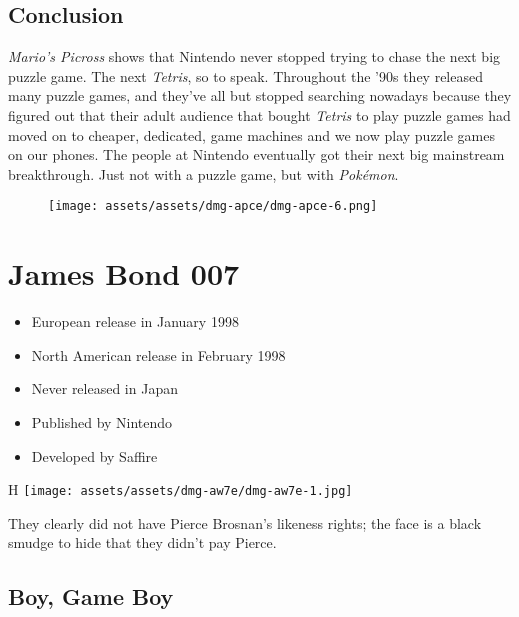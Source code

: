 \documentclass{book}
\begin{document}
\FloatBarrier\needspace{5pt}\section*{Conclusion}\nopagebreak[4]

\emph{Mario’s Picross} shows that Nintendo never stopped trying to chase the next big puzzle game. The next \emph{Tetris}, so to speak. Throughout the ’90s they released many puzzle games, and they’ve all but stopped searching nowadays because they figured out that their adult audience that bought \emph{Tetris} to play puzzle games had moved on to cheaper, dedicated, game machines and we now play puzzle games on our phones. The people at Nintendo eventually got their next big mainstream breakthrough. Just not with a puzzle game, but with \emph{Pokémon}.

\begin{figure}[hbt]
\vskip 10pt
\centering \texttt{[image: assets/assets/dmg-apce/dmg-apce-6.png]}
\vskip 6pt
\end{figure}


\begingroup \chapter*{James Bond 007} \endgroup

\begin{itemize} \setlength\itemsep{-0.4em}
\item European release in January 1998
\item North American release in February 1998
\item Never released in Japan
\item Published by Nintendo
\item Developed by Saffire
\end{itemize}\noindent

\begin{wrapfigure}{H}{\linewidth}
\vskip 4pt
\centering \texttt{[image: assets/assets/dmg-aw7e/dmg-aw7e-1.jpg]}\par\pagetwodescription They clearly did not have Pierce Brosnan’s likeness rights; the face is a black smudge to hide that they didn’t pay Pierce.\end{wrapfigure}
\clearpage

\FloatBarrier\needspace{5pt}\section*{Boy, Game Boy}\nopagebreak[4]
\end{document}
